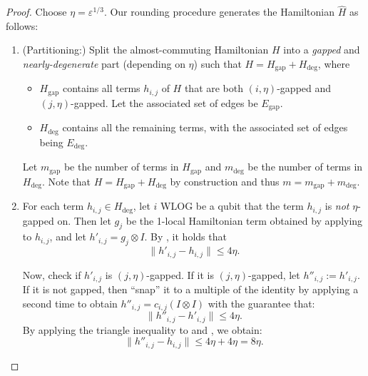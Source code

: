 \documentclass[11pt]{article}
\newcommand{\gap}{\mathrm{gap}}
\renewcommand{\deg}{\mathrm{deg}}
\theoremstyle{plain}
\newcommand{\eps}{\varepsilon}
\begin{document}
\begin{proof}
Choose $\eta =\eps^{1/3}$.
Our rounding procedure generates the Hamiltonian $\hat{H}$ as follows:

\begin{enumerate}
    \item (Partitioning:) Split the almost-commuting Hamiltonian $H$ into a \emph{gapped} and \emph{nearly-degenerate} part (depending on $\eta$) such that $H= H_{\gap} + H_{\deg}$, where
    \begin{itemize}
        \item $H_{\gap}$ contains all terms $h_{i,j}$ of $H$ that are both $(i,\eta)$-gapped and $(j,\eta)$-gapped. Let the associated set of edges be $E_{\gap}$.
        \item $H_{\deg}$ contains all the remaining terms, with the associated set of edges being $E_{\deg}$. 
    \end{itemize}
    Let $m_{\gap}$ be the number of terms in $H_{\gap}$ and $m_{\deg}$ be the number of terms in $H_{\deg}$. Note that $H = H_{\gap} + H_{\deg}$ by construction and thus $m = m_{\gap} + m_{\deg}$.
    \item For each term $h_{i,j} \in H_{\deg}$, let $i$ WLOG be a qubit that the term $h_{i,j}$ is \emph{not} $\eta$-gapped on. Then let $g_j$ be the 1-local Hamiltonian term obtained by applying  to $h_{i,j}$, and let $h'_{i,j} = g_j \otimes I$.  By , it holds that 
    \begin{equation}\label{eqn:h-prime}
        \| h'_{i,j} - h_{i,j} \| \leq 4\eta.
    \end{equation}

    
    Now, check if $h'_{i,j}$ is $(j, \eta)$-gapped. If it is $(j, \eta)$-gapped, let $h''_{i,j} := h'_{i,j}$. If it is not gapped, then ``snap'' it to a multiple of the identity by applying  a second time to obtain $h''_{i,j} = c_{i,j} \left(I \otimes I\right)$ with the guarantee that:
    \begin{equation}\label{eqn:h-double-prime}
        \|h''_{i,j} - h'_{i,j}\| \leq 4 \eta.
    \end{equation}
    By applying the triangle inequality to  and , we obtain:
    \begin{equation}
        \|h''_{i,j} - h_{i,j}\| \leq 4 \eta + 4 \eta = 8 \eta. \label{eq:double-snap-error}
    \end{equation}
    

\end{enumerate}
\end{proof}
\end{document}
